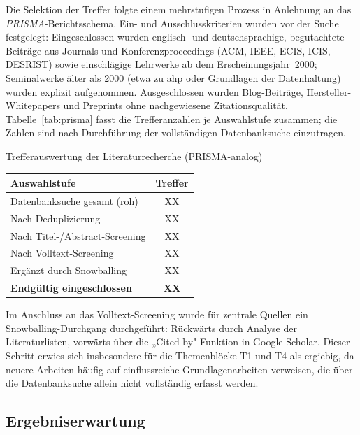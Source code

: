 Die Selektion der Treffer folgte einem mehrstufigen Prozess in Anlehnung an das \textit{PRISMA}-Berichtsschema.
Ein- und Ausschlusskriterien wurden vor der Suche festgelegt:
Eingeschlossen wurden englisch- und deutschsprachige, begutachtete Beiträge aus Journals und Konferenzproceedings (ACM, IEEE, ECIS, ICIS, DESRIST) sowie einschlägige Lehrwerke ab dem Erscheinungsjahr~2000; Seminalwerke älter als 2000 (etwa zu \gls{ahp} oder Grundlagen der Datenhaltung) wurden explizit aufgenommen.
Ausgeschlossen wurden Blog-Beiträge, Hersteller-Whitepapers und Preprints ohne nachgewiesene Zitationsqualität.
Tabelle~\ref{tab:prisma} fasst die Trefferanzahlen je Auswahlstufe zusammen; die Zahlen sind nach Durchführung der vollständigen Datenbanksuche einzutragen.

\begin{batable}[label=tab:prisma]{Trefferauswertung der Literaturrecherche (PRISMA-analog)}
\small\setlength{\tabcolsep}{6pt}\renewcommand{\arraystretch}{1.4}
\begin{tabular}{|l|c|}
\hline
\textbf{Auswahlstufe} & \textbf{Treffer} \\
\hline
Datenbanksuche gesamt (roh)           & XX \\
Nach Deduplizierung                   & XX \\
Nach Titel-/Abstract-Screening        & XX \\
Nach Volltext-Screening               & XX \\
Ergänzt durch Snowballing             & XX \\
\textbf{Endgültig eingeschlossen}     & \textbf{XX} \\
\hline
\end{tabular}
\end{batable}

Im Anschluss an das Volltext-Screening wurde für zentrale Quellen ein Snowballing-Durchgang durchgeführt: Rückwärts durch Analyse der Literaturlisten, vorwärts über die „Cited by"-Funktion in Google Scholar.
Dieser Schritt erwies sich insbesondere für die Themenblöcke T1 und T4 als ergiebig, da neuere Arbeiten häufig auf einflussreiche Grundlagenarbeiten verweisen, die über die Datenbanksuche allein nicht vollständig erfasst werden.

\subsection{Ergebniserwartung}

